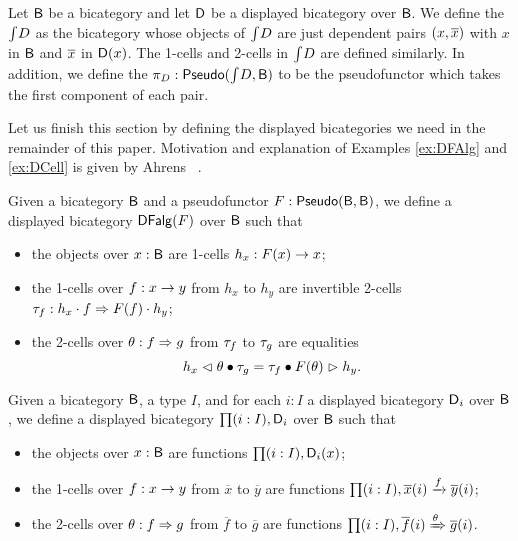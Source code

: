 \begin{definition}
\label{def:totalbicat}
Let $\B$ be a bicategory and let $\D$ be a displayed bicategory over $\B$.
We define the  $\total{D}$ as the bicategory whose objects of $\total{D}$ are just dependent pairs $(x, \xx)$ with $x$ in $\B$ and $\xx$ in $\dob{\D}{x}$.
The 1-cells and 2-cells in $\total{D}$ are defined similarly.
In addition, we define the  $\dproj{D} : \pseudo(\total{D}, \B)$ to be the pseudofunctor which takes the first component of each pair.
\end{definition}

Let us finish this section by defining the displayed bicategories we need in the remainder of this paper.
Motivation and explanation of Examples \ref{ex:DFAlg} and \ref{ex:DCell} is given by Ahrens \etal \ \cite{bicatjournal}.

\begin{example}
\label{ex:DFAlg}
Given a bicategory $\B$ and a pseudofunctor $F : \pseudo(\B, \B)$,
we define a displayed bicategory $\DFAlg(F)$ over $\B$ such that
\begin{itemize}
	\item the objects over $x : \B$ are 1-cells $h_x : F(x) \onecell x$;
	\item the 1-cells over $f : x \onecell y$ from $h_x$ to $h_y$ are invertible 2-cells $\tcC_f : h_x \cdot f \twocell F(f) \cdot h_y$;
	\item the 2-cells over $\tc : f \twocell g$ from $\tcC_f$ to $\tcC_g$ are equalities
	\[
	h_x \whiskerl \tc \vcomp \tcC_g = \tcC_f \vcomp F(\tc) \whiskerr h_y.
	\]
\end{itemize}
\end{example}

\begin{example}
\label{ex:disp_depprod}
Given a bicategory $\B$, a type $I$, and for each $i : I$ a displayed bicategory $\D_i$ over $\B$,
we define a displayed bicategory $\depprod{(i : I)}{\D_i}$ over $\B$ such that
\begin{itemize}
	\item the objects over $x : \B$ are functions $\depprod{(i : I)}{\D_i(x)}$;
	\item the 1-cells over $f : x \onecell y$ from $\overline{x}$ to $\overline{y}$ are functions $\depprod{(i : I)}{\dmor{\overline{x}(i)}{\overline{y}(i)}{f}}$;
	\item the 2-cells over $\tc : f \twocell g$ from $\overline{f}$ to $\overline{g}$ are functions $\depprod{(i : I)}{\dtwo{\overline{f}(i)}{\overline{g}(i)}{\tc}}$.
\end{itemize}
\end{example}

